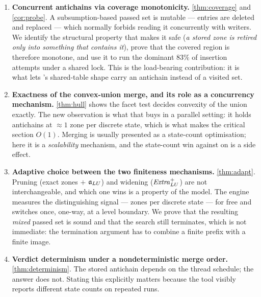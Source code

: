 \begin{enumerate}[label=\textbf{N\arabic*.}, leftmargin=2.2em, itemsep=4pt]

\item \textbf{Concurrent antichains via coverage monotonicity.}
      \cref{thm:coverage} and \cref{cor:probe}.  A subsumption-based passed set
      is mutable --- entries are deleted and replaced --- which normally forbids
      reading it concurrently with writers.  We identify the structural
      property that makes it safe (\emph{a stored zone is retired only into
      something that contains it}), prove that the covered region is therefore
      monotone, and use it to run the dominant $83\%$ of insertion attempts
      under a shared lock.  This is the load-bearing contribution: it is what
      lets \ltsmin{}'s shared-table shape carry an antichain instead of a
      visited set.

\item \textbf{Exactness of the convex-union merge, and its role as a
      concurrency mechanism.}  \cref{thm:hull} shows the facet test decides
      convexity of the union exactly.  The new observation is what that buys in
      a parallel setting: it holds antichains at $\approx 1$ zone per discrete
      state, which is what makes the critical section $O(1)$.  Merging is
      usually presented as a state-count optimisation; here it is a
      \emph{scalability} mechanism, and the state-count win against \uppaal{}
      on  is a side effect.

\item \textbf{Adaptive choice between the two finiteness mechanisms.}
      \cref{thm:adapt}.  Pruning (exact zones $+$ $\mathfrak{a}_{LU}$) and widening
      ($\mathit{Extra}^{+}_{LU}$) are not interchangeable, and which one wins is a property of
      the model.  The engine measures the distinguishing signal --- zones per
      discrete state --- for free and switches once, one-way, at a level
      boundary.  We prove that the resulting \emph{mixed} passed set is sound
      and that the search still terminates, which is not immediate: the
      termination argument has to combine a finite prefix with a finite image.

\item \textbf{Verdict determinism under a nondeterministic merge order.}
      \cref{thm:determinism}.  The stored antichain depends on the thread
      schedule; the answer does not.  Stating this explicitly matters because
      the tool visibly reports different state counts on repeated runs.


\end{enumerate}
